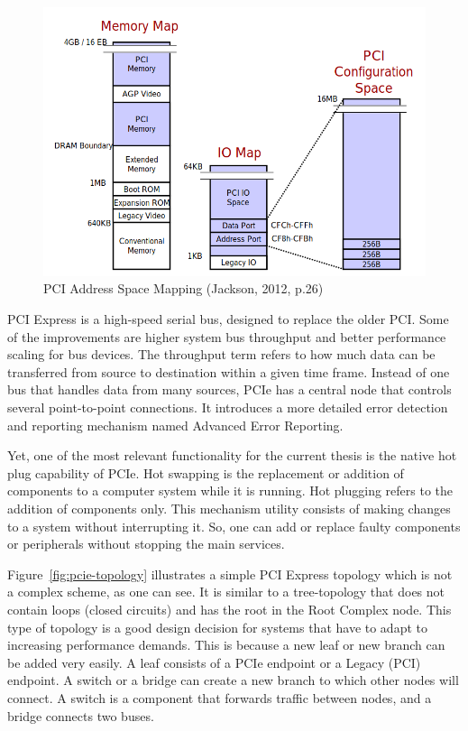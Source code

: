 \documentclass[12pt, a4paper]{report}
\begin{document}
\begin{figure}[H]
\centering
\includegraphics[width=\textwidth, keepaspectratio]{pics/pci-address-space-mapping.png}
  \caption{{PCI Address Space Mapping (Jackson, 2012, p.26)}\cite{book_pci_express}}
  \label{fig:pci-address-space-mapping}
\end{figure}

PCI Express is a high-speed serial bus, designed to replace the older PCI. Some of the improvements are higher system bus throughput and better performance scaling for bus devices. The throughput term refers to how much data can be transferred from source to destination within a given time frame. Instead of one bus that handles data from many sources, PCIe has a central node that controls several point-to-point connections. It introduces a more detailed error detection and reporting mechanism named Advanced Error Reporting.

Yet, one of the most relevant functionality for the current thesis is the native hot plug capability of PCIe. Hot swapping is the replacement or addition of components to a computer system while it is running. Hot plugging refers to the addition of components only. This mechanism utility consists of making changes to a system without interrupting it. So, one can add or replace faulty components or peripherals without stopping the main services.

Figure~\ref{fig:pcie-topology} illustrates a simple PCI Express topology which is not a complex scheme, as one can see. It is similar to a tree-topology that does not contain loops (closed circuits) and has the root in the Root Complex node. This type of topology is a good design decision for systems that have to adapt to increasing performance demands. This is because a new leaf or new branch can be added very easily. A leaf consists of a PCIe endpoint or a Legacy (PCI) endpoint. A switch or a bridge can create a new branch to which other nodes will connect. A switch is a component that forwards traffic between nodes, and a bridge connects two buses.
\end{document}
